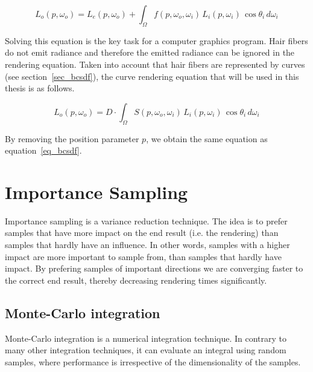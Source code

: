 \documentclass[11pt,a4paper]{report}
\begin{document}
\begin{equation}
L_o(p, \omega_o) = L_e(p, \omega_o) + \int_{\Omega} f(p, \omega_o, \omega_i)\, L_i(p, \omega_i)\, \cos \theta_i\, d\omega_i
\end{equation}

Solving this equation is the key task for a computer graphics program. Hair fibers do not emit radiance and therefore the emitted radiance can be ignored in the rendering equation. Taken into account that hair fibers are represented by curves (see section~\ref{sec_bcsdf}), the curve rendering equation that will be used in this thesis is as follows.

\begin{equation}
L_o(p, \omega_o) = D \cdot \int_{\Omega} S(p, \omega_o, \omega_i)\, L_i(p, \omega_i)\, \cos \theta_i\, d\omega_i
\label{renderingEquation}
\end{equation}

By removing the position parameter $p$, we obtain the same equation as equation~\ref{eq_bcsdf}.

%
%

\section{Importance Sampling}
\label{basics_importance_sampling}


Importance sampling is a variance reduction technique. The idea is to prefer samples that have more impact on the end result (i.e. the rendering) than samples that hardly have an influence. In other words, samples with a higher impact are more important to sample from, than samples that hardly have impact. By prefering samples of important directions we are converging faster to the correct end result, thereby decreasing rendering times significantly.

\subsection{Monte-Carlo integration}

Monte-Carlo integration is a numerical integration technique. In contrary to many other integration techniques, it can evaluate an integral using random samples, where performance is irrespective of the dimensionality of the samples.
\end{document}
